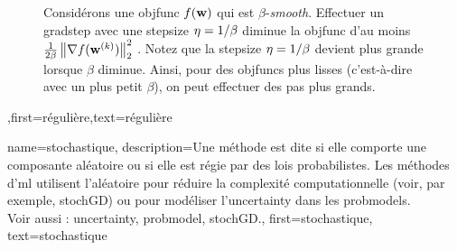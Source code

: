 {{\begin{figure}[H]
\begin{center}
			\end{center}
			\caption{Considérons une \gls{objfunc} $f({\bf w})$ qui est $\beta$-\textit{smooth}. 
				Effectuer un \gls{gradstep} avec une \gls{stepsize} $\eta = 1/\beta$ diminue la 
				\gls{objfunc} d’au moins $\frac{1}{2\beta}\left\Vert {\nabla f({\bf w}^{(k)})} \right\Vert_{2}^{2}$ \cite{nesterov04,CvxAlgBertsekas,CvxBubeck2015}. 
				Notez que la \gls{stepsize} $\eta = 1/\beta$ devient plus grande lorsque $\beta$ diminue. Ainsi, 
				pour des \glspl{objfunc} plus lisses (c’est-à-dire avec un plus petit $\beta$), 
				on peut effectuer des pas plus grands. \label{fig_gd_smooth_dict}}
		\end{figure}
	},first={régulière},text={régulière}}


{name={stochastique},
	description={Une méthode est dite  si elle comporte une composante aléatoire 
		ou si elle est régie par des lois probabilistes. Les méthodes d'\gls{ml} utilisent l'aléatoire 
		pour réduire la complexité computationnelle (voir, par exemple, \gls{stochGD}) ou pour modéliser 
		l'\gls{uncertainty} dans les \glspl{probmodel}. \\
		Voir aussi : \gls{uncertainty}, \gls{probmodel}, \gls{stochGD}.},
	first={stochastique},
	text={stochastique}
}

